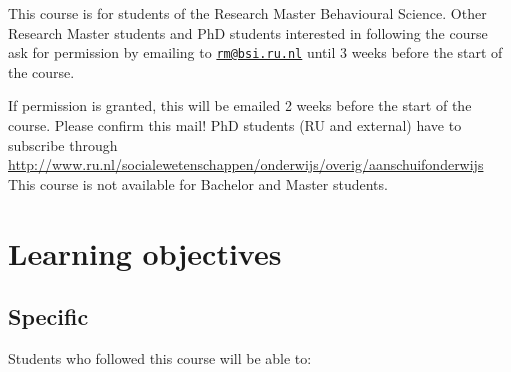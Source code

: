 \documentclass[12pt,]{book}
\let\stdsection\section
\renewcommand\section{\newpage\stdsection}
\begin{document}
This course is for students of the Research Master Behavioural Science. Other Research Master students and PhD students interested in following the course ask for permission by emailing to \href{mailto:rm@bsi.ru.nl}{\nolinkurl{rm@bsi.ru.nl}} until 3 weeks before the start of the course.

If permission is granted, this will be emailed 2 weeks before the start of the course. Please confirm this mail! PhD students (RU and external) have to subscribe through \url{http://www.ru.nl/socialewetenschappen/onderwijs/overig/aanschuifonderwijs}
This course is not available for Bachelor and Master students.

\hypertarget{learning-objectives}{%
\section*{\texorpdfstring{\textbf{Learning objectives}}{Learning objectives}}\label{learning-objectives}}

\hypertarget{specific}{%
\subsection*{Specific}\label{specific}}

Students who followed this course will be able to:
\end{document}
